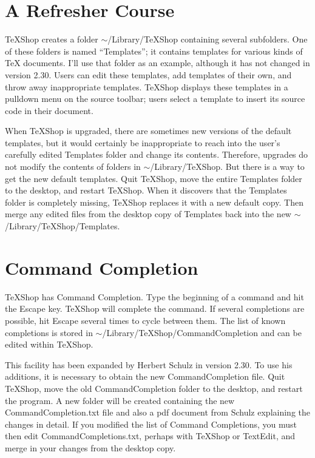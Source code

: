 \documentclass[11pt, oneside]{amsart}
\begin{document}
\section{A Refresher Course}

TeXShop creates a folder $\sim$/Library/TeXShop containing several subfolders. One of these folders is named ``Templates''; it  contains templates for various kinds of TeX documents. I'll use that folder as an example, although it has not changed in version 2.30. Users can edit these templates, add templates of their own, and throw away inappropriate templates. TeXShop displays these templates in a pulldown menu on the source toolbar; users select a template to insert its source code in their document.

When TeXShop is upgraded, there are sometimes new versions of the default templates, but it would certainly be inappropriate to reach into the user's carefully edited Templates folder and change its contents. Therefore, upgrades do not modify the contents of folders in $\sim$/Library/TeXShop. But there is a way to get the new default templates. Quit TeXShop, move the entire Templates folder to the desktop, and restart TeXShop. When it discovers that the Templates folder is completely missing, TeXShop replaces it with a new default copy. Then merge any edited files from the desktop copy of Templates back into the new $\sim$/Library/TeXShop/Templates. 

\section{Command Completion}
TeXShop has Command Completion. Type the beginning of a command and hit the Escape key. TeXShop will complete the command. If several completions are possible, hit Escape several times to cycle between them.
The list of known completions is stored in $\sim$/Library/TeXShop/CommandCompletion and  can be edited within TeXShop.

This facility has been expanded by Herbert Schulz in version 2.30. To use his additions, it is necessary to obtain the new CommandCompletion file. Quit TeXShop,  move the old CommandCompletion folder to the desktop,   and restart the program. A new folder will be created containing the new CommandCompletion.txt file and also a pdf document from Schulz explaining the changes in detail. If you modified the list of Command Completions, you must then edit CommandCompletions.txt, perhaps with TeXShop or TextEdit, and merge in your changes from the desktop copy.
\end{document}
